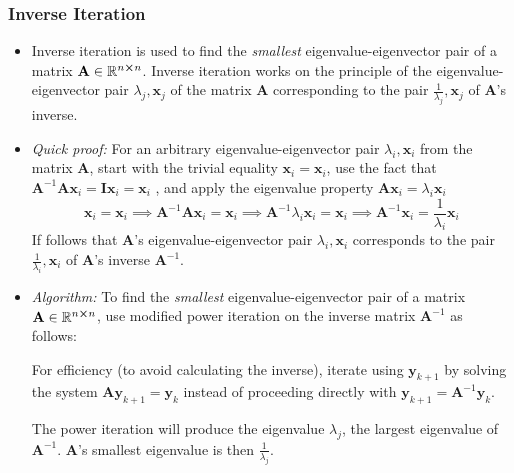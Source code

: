 \documentclass[11pt, a4paper]{article}
\newcommand{\R}{\mathbb{R}} %
\newcommand{\mat}[1]{\mathbf{#1}} %
\begin{document}
\subsubsection{Inverse Iteration}
\begin{itemize}
	\item Inverse iteration is used to find the \textit{smallest} eigenvalue-eigenvector pair of a matrix $ \mat{A} \in \R^{n \cross n} $. Inverse iteration works on the principle of the eigenvalue-eigenvector pair $ \lambda_j, \bm{x}_j $ of the matrix $ \mat{A} $ corresponding to the pair $ \frac{1}{\lambda_j}, \bm{x}_j $ of $ \mat{A} $'s inverse.
	
	\item \textit{Quick proof:} For an arbitrary eigenvalue-eigenvector pair $ \lambda_{i}, \bm{x}_{i} $ from the matrix $ \mat{A} $, start with the trivial equality $ \bm{x}_{i} = \bm{x}_{i} $, use the fact that $ \mat{A}^{-1}\mat{A} \bm{x}_{i} = \mat{I} \bm{x}_{i} = \bm{x}_{i}$ , and apply the eigenvalue property $ \mat{A}\mat{x}_{i} = \lambda_{i}\bm{x}_{i}  $
	\begin{equation*}
		\bm{x}_{i} = \bm{x}_{i} \implies \mat{A}^{-1}\mat{A} \bm{x}_{i} = \bm{x}_{i} \implies \mat{A}^{-1}\lambda_{i}\bm{x}_{i} = \bm{x}_{i} \implies \mat{A}^{-1}\bm{x}_{i} = \frac{1}{\lambda_{i}}\bm{x}_{i} 
	\end{equation*}
	If follows that $ \mat{A} $'s eigenvalue-eigenvector pair $ \lambda_i, \bm{x}_i $ corresponds to the pair $ \frac{1}{\lambda_i}, \bm{x}_i $ of $ \mat{A} $'s inverse $ \mat{A}^{-1} $.
	
	\item \textit{Algorithm:} To find the \textit{smallest} eigenvalue-eigenvector pair of a matrix $ \mat{A} \in \R^{n \cross n} $, use modified power iteration on the inverse matrix $ \mat{A}^{-1} $ as follows:
	
	For efficiency (to avoid calculating the inverse), iterate using $ \bm{y}_{k+1} $ by solving the system $ \mat{A} \bm{y}_{k+1} = \bm{y}_{k} $ instead of proceeding directly with $ \bm{y}_{k+1} = \mat{A}^{-1} \bm{y}_{k} $. 
	
	The power iteration will produce the eigenvalue $ \lambda_{j} $, the largest eigenvalue of $ \mat{A}^{-1} $. $ \mat{A} $'s smallest eigenvalue is then $ \frac{1}{\lambda_{j}} $.
	
	
\end{itemize}
\end{document}
